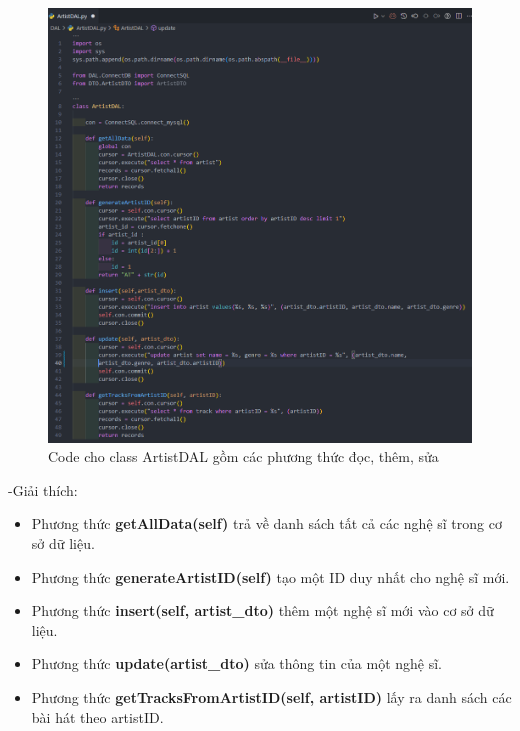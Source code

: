 \documentclass[a4paper]{article}
\begin{document}
\newpage
\begin{figure}[h]
	\centering
	\includegraphics[width=\textwidth]{images/artistDAL.png}
	\caption{Code cho class ArtistDAL gồm các phương thức đọc, thêm, sửa}
\end{figure}
\begin{flushleft}
	-Giải thích:
	\begin{itemize}
		\item Phương thức \textbf{getAllData(self)} trả về danh sách tất cả các nghệ sĩ trong cơ sở dữ liệu.

		\item Phương thức \textbf{generateArtistID(self)} tạo một ID duy nhất cho nghệ sĩ mới.

		\item Phương thức \textbf{insert(self, artist\_dto)} thêm một nghệ sĩ mới vào cơ sở dữ liệu.

		\item Phương thức \textbf{update(artist\_dto)} sửa thông tin của một nghệ sĩ.

		\item Phương thức \textbf{getTracksFromArtistID(self, artistID)} lấy ra danh sách các bài hát theo artistID.

	\end{itemize}
\end{flushleft}
\end{document}
